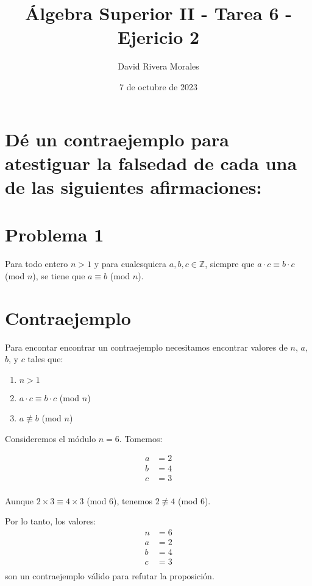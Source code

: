 \documentclass{article}
\title{Álgebra Superior II - Tarea 6 - Ejericio 2}
\author{David Rivera Morales}
\date{7 de octubre de 2023}
\begin{document}
\maketitle

\section*{Dé un contraejemplo para atestiguar la falsedad de cada una de las siguientes afirmaciones:}

\section*{Problema 1}
Para todo entero \( n > 1 \) y para cualesquiera \( a, b, c \in \mathbb{Z} \), siempre que \( a \cdot c \equiv b \cdot c \) (mod \( n \)), se tiene que \( a \equiv b \) (mod \( n \)).

\section*{Contraejemplo}
Para encontar encontrar un contraejemplo necesitamos encontrar valores de \( n \), \( a \), \( b \), y \( c \) tales que:

\begin{enumerate}
    \item \( n > 1 \)
    \item \( a \cdot c \equiv b \cdot c \) (mod \( n \))
    \item \( a \not\equiv b \) (mod \( n \))
\end{enumerate}

Consideremos el módulo \( n = 6 \). Tomemos:

\[
\begin{aligned}
    a &= 2 \\
    b &= 4 \\
    c &= 3 \\
\end{aligned}
\]

Aunque \( 2 \times 3 \equiv 4 \times 3 \) (mod 6), tenemos \( 2 \not\equiv 4 \) (mod 6).

Por lo tanto, los valores:
\[
\begin{aligned}
    n &= 6 \\
    a &= 2 \\
    b &= 4 \\
    c &= 3 \\
\end{aligned}
\]
son un contraejemplo válido para refutar la proposición.
\end{document}
